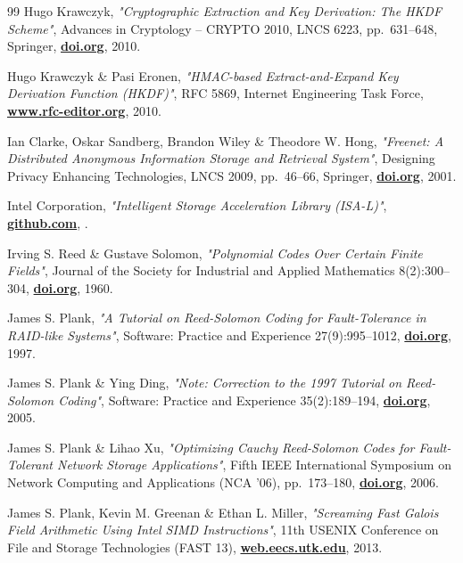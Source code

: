 \documentclass[10pt,a4paper,final]{article}
\let\oldhref\href
\renewcommand{\href}[2]{\oldhref{#1}{\bfseries#2}}
\begin{document}
\begin{thebibliography}{99}
	Hugo Krawczyk,
	\emph{"Cryptographic Extraction and Key Derivation: The HKDF Scheme"},
	Advances in Cryptology -- CRYPTO 2010, LNCS 6223, pp.~631--648, Springer,
	\href{https://doi.org/10.1007/978-3-642-14623-7_34}{doi.org},
	2010.

	Hugo Krawczyk \& Pasi Eronen,
	\emph{"HMAC-based Extract-and-Expand Key Derivation Function (HKDF)"},
	RFC 5869, Internet Engineering Task Force,
	\href{https://www.rfc-editor.org/rfc/rfc5869}{www.rfc-editor.org},
	2010.

	Ian Clarke, Oskar Sandberg, Brandon Wiley \& Theodore W. Hong,
	\emph{"Freenet: A Distributed Anonymous Information Storage and Retrieval System"},
	Designing Privacy Enhancing Technologies, LNCS 2009, pp.~46--66, Springer,
	\href{https://doi.org/10.1007/3-540-44702-4_4}{doi.org},
	2001.

	Intel Corporation,
	\emph{"Intelligent Storage Acceleration Library (ISA-L)"},
	\href{https://github.com/intel/isa-l}{github.com},
	\the\year{}.

	Irving S. Reed \& Gustave Solomon,
	\emph{"Polynomial Codes Over Certain Finite Fields"},
	Journal of the Society for Industrial and Applied Mathematics 8(2):300--304,
	\href{https://doi.org/10.1137/0108018}{doi.org},
	1960.

	James S. Plank,
	\emph{"A Tutorial on Reed-Solomon Coding for Fault-Tolerance in RAID-like Systems"},
	Software: Practice and Experience 27(9):995--1012,
	\href{https://doi.org/10.1002/(SICI)1097-024X(199709)27:9\%3C995::AID-SPE111\%3E3.0.CO;2-6}{doi.org},
	1997.

	James S. Plank \& Ying Ding,
	\emph{"Note: Correction to the 1997 Tutorial on Reed-Solomon Coding"},
	Software: Practice and Experience 35(2):189--194,
	\href{https://doi.org/10.1002/spe.631}{doi.org},
	2005.

	James S. Plank \& Lihao Xu,
	\emph{"Optimizing Cauchy Reed-Solomon Codes for Fault-Tolerant Network Storage Applications"},
	Fifth IEEE International Symposium on Network Computing and Applications (NCA '06), pp.~173--180,
	\href{https://doi.org/10.1109/NCA.2006.43}{doi.org},
	2006.

	James S. Plank, Kevin M. Greenan \& Ethan L. Miller,
	\emph{"Screaming Fast Galois Field Arithmetic Using Intel SIMD Instructions"},
	11th USENIX Conference on File and Storage Technologies (FAST 13),
	\href{https://web.eecs.utk.edu/~jplank/plank/papers/FAST-2013-GF.html}{web.eecs.utk.edu},
	2013.


\end{thebibliography}
\end{document}
